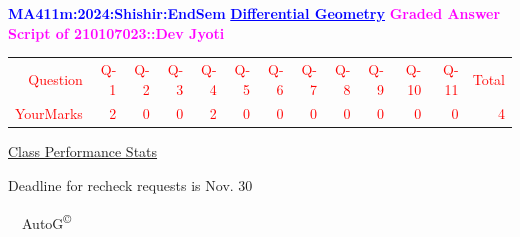 \documentclass{article}                              %
\begin{document}
%
\vspace*{1in}

\begin{center}
	\textbf{\textcolor{blue}{\LARGE MA411m:2024:Shishir:EndSem}}
	\vskip 1cm
	\textbf{\textcolor{blue}{\underline{\Large Differential Geometry}}}
	\vskip 1cm
	\textbf{\textcolor{magenta}{\LARGE Graded Answer Script of 210107023::Dev Jyoti}}
\end{center}


\begin{center}
	\Huge 
	\textcolor{red}{
	\begin{tabular}{*{13}{r}}
		Question&Q-1& Q-2& Q-3& Q-4& Q-5& Q-6& Q-7& Q-8& Q-9& Q-10& Q-11&Total  \\
        	YourMarks&2&0&0&2&0&0&0&0&0&0&0&4
	\end{tabular}
	}
        \vskip 2cm
	\large
	\underline{Class Performance Stats}
	\DTLsetseparator{;}
	\begin{table}[htbp]
		\centering
	\end{table}
	\vskip 1cm
	Deadline for recheck requests is Nov. 30
\end{center}
\ \vfill \ \hfill \small AutoG\textsuperscript{\copyright}
\newpage
%
\end{document}
